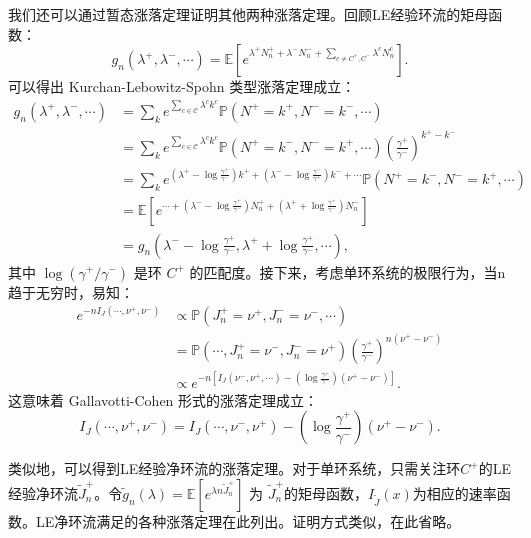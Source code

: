 我们还可以通过暂态涨落定理证明其他两种涨落定理。回顾LE经验环流的矩母函数：
\begin{equation*}
    g_n(\lambda^+,\lambda^-,\cdots)
    = \mathbb{E}\left[e^{\lambda^+N^+_n+\lambda^-N^-_n+\sum_{c\neq C^+,C^-}\lambda^cN^c_n}\right].
\end{equation*}
可以得出 Kurchan-Lebowitz-Spohn 类型涨落定理成立：
\begin{align*}
    g_n(\lambda^+,\lambda^-,\cdots)
    &= \sum_{k}e^{\sum_{c\in\mathcal{C}}\lambda^ck^c}\mathbb{P}\left(N^+=k^+,N^-=k^-,\cdots\right)\\
    &= \sum_{k}e^{\sum_{c\in\mathcal{C}}\lambda^ck^c}
    \mathbb{P}\left(N^+=k^-,N^-=k^+,\cdots\right) \left(\frac{\gamma^+}{\gamma^-}\right)^{k^+-k^-}\\
    &= \sum_{k}e^{\left(\lambda^+-\log\frac{\gamma^+}{\gamma^-}\right)k^++
    \left(\lambda^--\log\frac{\gamma^-}{\gamma^+}\right)k^-+\cdots}\mathbb{P}(N^+=k^-,N^-=k^+,\cdots)\\
    &= \mathbb{E}\left[e^{\cdots+\left(\lambda^--\log\frac{\gamma^+}{\gamma^-}\right)N^+_n+
    \left(\lambda^++\log\frac{\gamma^+}{\gamma^-}\right)N^-_n}\right]\\
    &= g_n\left(\lambda^--\log\frac{\gamma^+}{\gamma^-},
    \lambda^++\log\frac{\gamma^+}{\gamma^-},\cdots\right),
\end{align*}
其中 $\log(\gamma^+/\gamma^-)$ 是环 $C^+$ 的匹配度。接下来，考虑单环系统的极限行为，当n趋于无穷时，易知：
\begin{align*}
e^{-nI_J(\cdots,\nu^+,\nu^-)}
&\propto \mathbb{P}\left(J^+_n=\nu^+, J^-_n=\nu^-, \cdots\right)\\
&= \mathbb{P}\left(\cdots,J^+_n=\nu^-, J^-_n=\nu^+\right)
\left(\frac{\gamma^+}{\gamma^-}\right)^{n(\nu^+-\nu^-)}\\
&\propto e^{-n\left[I_J(\nu^-,\nu^+,\cdots)-\left(\log\frac{\gamma^+}{\gamma^-}\right)
(\nu^+-\nu^-)\right]}.
\end{align*}
这意味着 Gallavotti-Cohen 形式的涨落定理成立：
\begin{equation}\label{G-C type fluctuation}
    I_J(\cdots,\nu^+,\nu^-)=I_J(\cdots,\nu^-,\nu^+)-\left(\log\frac{\gamma^+}{\gamma^-}\right)(\nu^+-\nu^-).
\end{equation}

类似地，可以得到LE经验净环流的涨落定理。对于单环系统，只需关注环$C^+$的LE经验净环流$\tilde{J}_n^+$。令$\tilde{g}_n(\lambda) = \mathbb{E}[e^{\lambda n\tilde{J}^+_n}]$ 为 $\tilde{J}^+_n$的矩母函数，$I_{\tilde{J}}(x)$为相应的速率函数。LE净环流满足的各种涨落定理在此列出。证明方式类似，在此省略。


